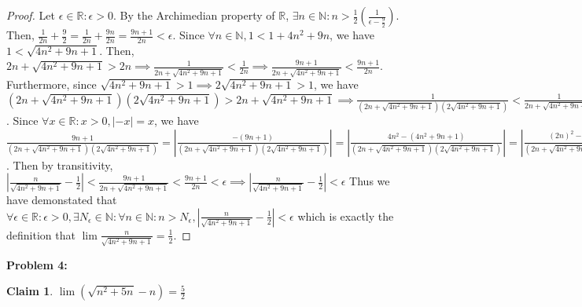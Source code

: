 \documentclass{article}
\newcommand{\reals}{\ensuremath{\mathbb{R}}}
\newcommand{\nats}{\ensuremath{\mathbb{N}}}
\newcommand{\eps}{\ensuremath{\epsilon}}
\newcommand{\neps}{\ensuremath{N_\epsilon}}
\newcommand{\csn}{\sqrt{4n^2+9n+1}}
\newcommand{\dsn}{\sqrt{n^2 + 5n}}
\newtheorem{clm}{Claim}
\begin{document}
\begin{proof}
	Let $\eps \in \reals: \eps > 0$.
	By the Archimedian property of \reals,
	$\exists n \in \nats: n > \frac{1}{2}(\frac{1}{\eps - \frac{9}{2}})$.
	Then, $\frac{1}{2n} + \frac{9}{2} = \frac{1}{2n} + \frac{9n}{2n} = \frac{9n+1}{2n}< \eps$.
	Since $\forall n \in \nats, 1 < 1 + 4n^2 + 9n$, we have $1 < \csn$.
	Then, $2n + \csn > 2n \implies \frac{1}{2n + \csn} < \frac{1}{2n}
	\implies \frac{9n+1}{2n + \csn} < \frac{9n+1}{2n} $. 
	Furthermore, since $\csn > 1 \implies 2\csn > 1$,
	we have $(2n + \csn)(2\csn) > 2n + \csn \implies \frac{1}{(2n + \csn)(2\csn)} < \frac{1}{2n + \csn}
	\implies \frac{9n+1}{(2n + \csn)(2\csn)} < \frac{9n+1}{2n + \csn}$.
	Since $\forall x \in \reals: x > 0, |-x| = x$,
	we have $\frac{9n+1}{(2n + \csn)(2\csn)} = |\frac{-(9n+1)}{(2n + \csn)(2\csn)}|
	= |\frac{4n^2 -(4n^2 +9n+1)}{(2n + \csn)(2\csn)}| = |\frac{(2n)^2 - (\csn)^2}{(2n + \csn)(2\csn)}|
	= |\frac{2n - \csn}{2\csn}| = |\frac{n}{\csn} - \frac{1}{2}|$.
	Then by transitivity, $|\frac{n}{\csn} - \frac{1}{2}| < \frac{9n+1}{2n + \csn} < \frac{9n+1}{2n} < \eps
	\implies |\frac{n}{\csn} - \frac{1}{2}| < \eps$
	Thus we have demonstated that $\forall \eps \in \reals : \eps > 0, \exists \neps \in \nats:
	\forall n \in \nats: n > \neps,
	|\frac{n}{\csn} - \frac{1}{2}| < \eps$
	which is exactly the definition that
	$\lim \frac{n}{\csn} = \frac{1}{2}$.
\end{proof}

\textbf{Problem 4:}

\begin{clm} \label{c4}
	$\lim(\dsn - n) = \frac{5}{2}$
\end{clm}
\end{document}
